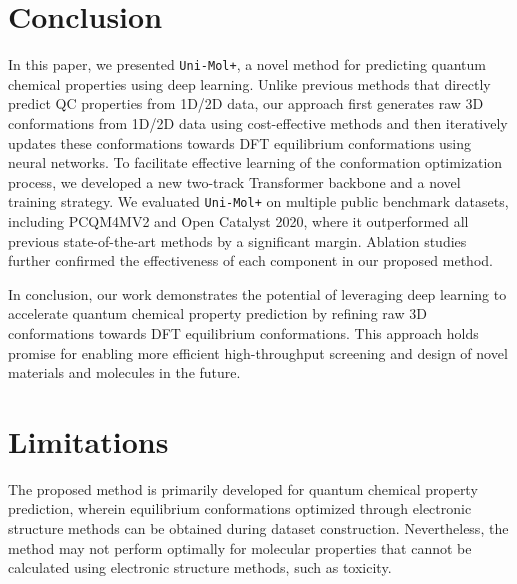 \documentclass{article}
\newcommand{\name}{\texttt{Uni-Mol+}\xspace}
\begin{document}
\section{Conclusion}
\vspace{-6pt}


In this paper, we presented \name, a novel method for predicting quantum chemical properties using deep learning. Unlike previous methods that directly predict QC properties from 1D/2D data, our approach first generates raw 3D conformations from 1D/2D data using cost-effective methods and then iteratively updates these conformations towards DFT equilibrium conformations using neural networks. To facilitate effective learning of the conformation optimization process, we developed a new two-track Transformer backbone and a novel training strategy. We evaluated \name on multiple public benchmark datasets, including PCQM4MV2 and Open Catalyst 2020, where it outperformed all previous state-of-the-art methods by a significant margin. Ablation studies further confirmed the effectiveness of each component in our proposed method.

In conclusion, our work demonstrates the potential of leveraging deep learning to accelerate quantum chemical property prediction by refining raw 3D conformations towards DFT equilibrium conformations. This approach holds promise for enabling more efficient high-throughput screening and design of novel materials and molecules in the future.



\vspace{-6pt}
\section*{Limitations}
\vspace{-6pt}

The proposed method is primarily developed for quantum chemical property prediction, wherein equilibrium conformations optimized through electronic structure methods can be obtained during dataset construction. Nevertheless, the method may not perform optimally for molecular properties that cannot be calculated using electronic structure methods, such as toxicity.











\appendix
\end{document}
